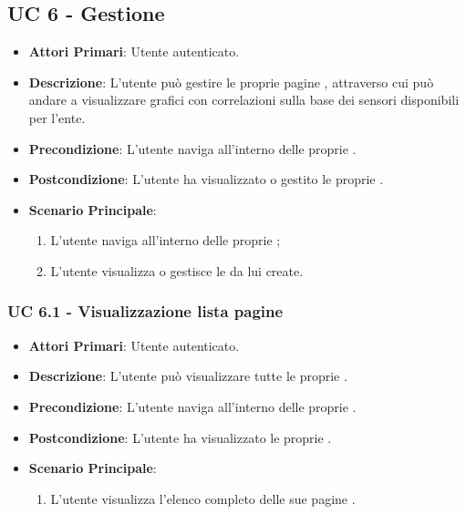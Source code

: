 	\subsection{UC 6 - Gestione }
		\begin{itemize}
			\item \textbf{Attori Primari}: Utente autenticato.
			\item \textbf{Descrizione}: L'utente può gestire le proprie pagine , attraverso cui può andare a visualizzare grafici con correlazioni sulla base dei sensori disponibili per l'ente.
			\item \textbf{Precondizione}: L'utente naviga all'interno delle proprie .
			\item \textbf{Postcondizione}: L'utente ha visualizzato o gestito le proprie .
			\item \textbf{Scenario Principale}:
			\begin{enumerate}
				\item{L'utente naviga all'interno delle proprie ;}
				\item{L'utente visualizza o gestisce le  da lui create.}
			\end{enumerate}	
		\end{itemize}

			\subsubsection{UC 6.1 - Visualizzazione lista pagine }
			\begin{itemize}
				\item \textbf{Attori Primari}: Utente autenticato.
				\item \textbf{Descrizione}: L'utente può visualizzare tutte le proprie .
				\item \textbf{Precondizione}: L'utente naviga all'interno delle proprie .
				\item \textbf{Postcondizione}: L'utente ha visualizzato le proprie .
				\item \textbf{Scenario Principale}:
				\begin{enumerate}
					\item{L'utente visualizza l'elenco completo delle sue pagine .}
				\end{enumerate}	
			\end{itemize}

